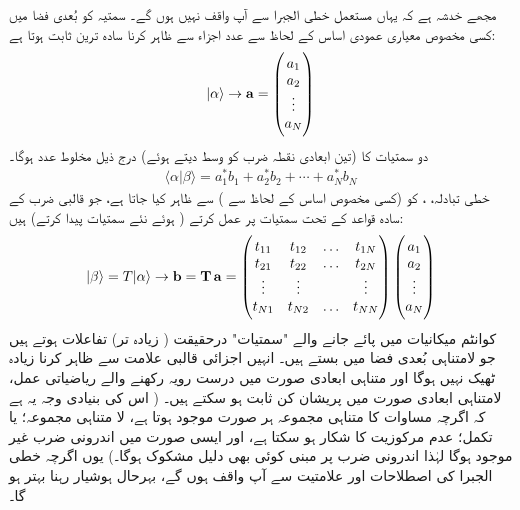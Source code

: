  مجھے خدشہ ہے کہ یہاں مستعمل خطی الجبرا سے آپ واقف نہیں ہوں گے۔ سمتیہ کو  بُعدی فضا میں کسی مخصوص معیاری عمودی اساس کے لحاظ سے  عدد اجزاء 
 سے ظاہر کرنا سادہ ترین ثابت ہوتا ہے:
	\begin{align}
		|\alpha \rangle \rightarrow \operatorname{\mathbf{a}} = \begin{pmatrix} 
			a_{1}\\
			a_{2}\\
			\vdots\\
			a_{N}
		 \end{pmatrix}
	\end{align}
 دو سمتیات کا 
  (تین ابعادی نقطہ ضرب کو وسط دیتے ہوئے) درج ذیل مخلوط عدد ہوگا۔
\begin{align}\label{مساوات_قواعد_اندرونی_ضرب}
	\langle \alpha | \beta\rangle =a_1^{\ast}b_1 + a_2^{\ast}b_2 + \dotsb +a_N^{\ast}b_N
\end{align}
خطی تبادلہ، ، کو (کسی مخصوص اساس کے لحاظ سے )  سے ظاہر کیا جاتا ہے، جو قالبی ضرب کے سادہ قواعد کے تحت سمتیات پر عمل کرتے ( ہوئے نئے سمتیات پیدا کرتے) ہیں:
\begin{align}
	|\beta\rangle = T|\alpha \rangle \rightarrow \operatorname{\mathbf{b}} = \operatorname{\mathbf{T}}\operatorname{\mathbf{a}} = \begin{pmatrix}
		t_{11} & t_{12} & \hdots & t_{1N} \\ 
		t_{21} & t_{22} & \hdots & t_{2N} \\
		\vdots & \vdots & & \vdots \\
		t_{N1} & t_{N2} & \hdots & t_{NN} 
	\end{pmatrix}
\begin{pmatrix}
	a_{1}\\
	a_{2}\\
	\vdots\\
	a_{N}
\end{pmatrix}
\end{align}
کوانٹم میکانیات میں پائے جانے والے "سمتیات" درحقیقت ( زیادہ تر) تفاعلات ہوتے ہیں جو لامتناہی بُعدی فضا میں بستے ہیں۔ انہیں  اجزائی قالبی علامت سے ظاہر کرنا زیادہ ٹھیک نہیں ہوگا اور متناہی ابعادی صورت میں درست رویہ رکھنے والے ریاضیاتی عمل، لامتناہی ابعادی صورت میں پریشان کن ثابت ہو سکتے ہیں۔ ( اس کی بنیادی وجہ یہ ہے کہ اگرچہ مساوات  کا متناہی مجموعہ ہر صورت موجود ہوتا ہے، لا متناہی مجموعہ؛ یا تکمل؛ عدم مرکوزیت کا شکار ہو سکتا ہے، اور ایسی صورت میں اندرونی ضرب غیر موجود ہوگا لہٰذا اندرونی ضرب پر مبنی کوئی بھی دلیل مشکوک ہوگا۔) یوں اگرچہ خطی الجبرا کی اصطلاحات اور علامتیت سے آپ واقف ہوں گے، بہرحال ہوشیار رہنا بہتر ہو گا۔

